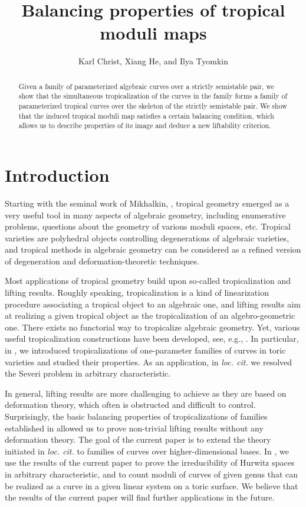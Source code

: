 \documentclass[11pt,reqno]{amsart}
\title{Balancing properties of tropical moduli maps}
\author{Karl Christ, Xiang He, and Ilya Tyomkin}
\numberwithin{equation}{section}
\theoremstyle{definition}
\theoremstyle{remark}
\begin{document}
\begin{abstract}
Given a family of parameterized algebraic curves over a strictly semistable pair, we show that the simultaneous tropicalization of the curves in the family forms a family of parameterized tropical curves over the skeleton of the strictly semistable pair. We show that the induced tropical moduli map satisfies a certain balancing condition, which allows us to describe properties of its image and deduce a new liftability criterion.
\end{abstract}
	
\maketitle
	
\setcounter{tocdepth}{1}

\section{Introduction}

Starting with the seminal work of Mikhalkin, \cite{Mik05}, tropical geometry emerged as a very useful tool in many aspects of algebraic geometry, including enumerative problems, questions about the geometry of various moduli spaces, etc. Tropical varieties are polyhedral objects controlling degenerations of algebraic varieties, and tropical methods in algebraic geometry can be considered as a refined version of degeneration and deformation-theoretic techniques. 

Most applications of tropical geometry build upon so-called tropicalization and lifting results. Roughly speaking, tropicalization is a kind of linearization procedure associating a tropical object to an algebraic one, and lifting results aim at realizing a given tropical object as the tropicalization of an algebro-geometric one. There exists no functorial way to tropicalize algebraic geometry. Yet, various useful tropicalization constructions have been developed, see, e.g., \cite{Mik05, Tyo12, ACP15, ABBR15, Tyo17, ACGS, CCUW, Ran22, MUW21, CGM, CHT23}. In particular, in \cite{CHT23}, we introduced tropicalizations of one-parameter families of curves in toric varieties and studied their properties. As an application, in {\em loc. cit.} we resolved the Severi problem in arbitrary characteristic.

In general, lifting results are more challenging to achieve as they are based on deformation theory, which often is obstructed and difficult to control. Surprisingly, the basic balancing properties of tropicalizations of families established in \cite{CHT23} allowed us to prove non-trivial lifting results without any deformation theory. The goal of the current paper is to extend the theory initiated in {\em loc. cit.} to families of curves over higher-dimensional bases. In \cite{CHT24b, CHT25}, we use the results of the current paper to prove the irreducibility of Hurwitz spaces in arbitrary characteristic, and to count moduli of curves of given genus that can be realized as a curve in a given linear system on a toric surface. We believe that the results of the current paper will find further applications in the future.
\end{document}
